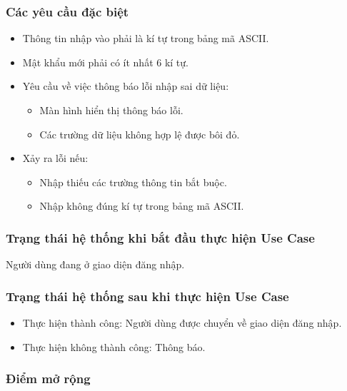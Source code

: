 \subsubsection{Các yêu cầu đặc biệt}
\begin{itemize}
    \item Thông tin nhập vào phải là kí tự trong bảng mã ASCII.
    \item Mật khẩu mới phải có ít nhất 6 kí tự.
    \item Yêu cầu về việc thông báo lỗi nhập sai dữ liệu:
    \begin{itemize}
        \item Màn hình hiển thị thông báo lỗi.
        \item Các trường dữ liệu không hợp lệ được bôi đỏ.
    \end{itemize}
    \item Xảy ra lỗi nếu:
    \begin{itemize}
        \item Nhập thiếu các trường thông tin bắt buộc.
        \item Nhập không đúng kí tự trong bảng mã ASCII.
    \end{itemize}
\end{itemize}

\subsubsection{Trạng thái hệ thống khi bắt đầu thực hiện Use Case}
Người dùng đang ở giao diện đăng nhập.

\subsubsection{Trạng thái hệ thống sau khi thực hiện Use Case}
\begin{itemize}
    \item Thực hiện thành công: Người dùng được chuyển về giao diện đăng nhập.
    \item Thực hiện không thành công: Thông báo.
\end{itemize}

\subsubsection{Điểm mở rộng}